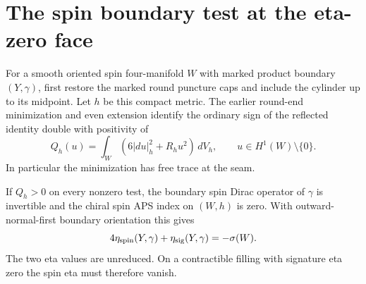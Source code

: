 \section{The spin boundary test at the eta-zero face}
\label{sec:eta-zero-filling}

For a smooth oriented spin four-manifold \(W\) with marked
product boundary \((Y,\gamma)\), first restore the marked round
puncture caps and include the cylinder up to its midpoint.
Let \(h\) be this compact metric. The earlier round-end
minimization and even extension identify the ordinary sign
of the reflected identity double with positivity of
\[
 Q_h(u)=\int_W(6|du|_h^2+R_hu^2)\,dV_h,
 \qquad u\in H^1(W)\setminus\{0\}.
\]
In particular the minimization has free trace at the seam.

\begin{proposition}
\label{prop:free-trace-spin}
If \(Q_h>0\) on every nonzero test, the boundary spin Dirac
operator of \(\gamma\) is invertible and the chiral spin
APS index on \((W,h)\) is zero. With outward-normal-first
boundary orientation this gives
\[
 4\eta_{\rm spin}(Y,\gamma)+\eta_{\rm sig}(Y,\gamma)
  =-\sigma(W).
\]
The two eta values are unreduced. On a contractible filling
with signature eta zero the spin eta must therefore vanish.
\end{proposition}

